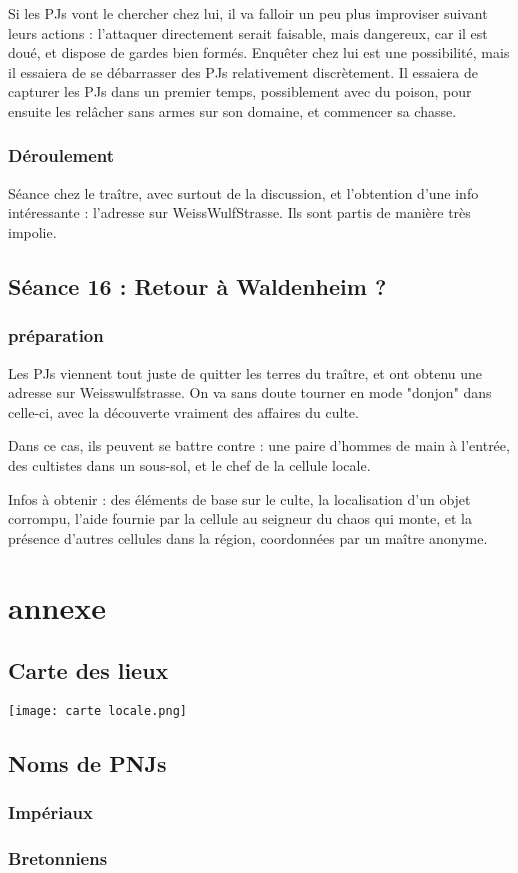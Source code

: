 \documentclass[10pt,a4paper]{book}
\begin{document}
Si les PJs vont le chercher chez lui, il va falloir un peu plus improviser suivant leurs actions : l'attaquer directement serait faisable, mais dangereux, car il est doué, et dispose de gardes bien formés. Enquêter chez lui est une possibilité, mais il essaiera de se débarrasser des PJs relativement discrètement. Il essaiera de capturer les PJs dans un premier temps, possiblement avec du poison, pour ensuite les relâcher sans armes sur son domaine, et commencer sa chasse.
\subsection{Déroulement}
Séance chez le traître, avec surtout de la discussion, et l'obtention d'une info intéressante : l'adresse sur WeissWulfStrasse. Ils sont partis de manière très impolie.
\section{Séance 16 : Retour à Waldenheim ?}
\subsection{préparation}
Les PJs viennent tout juste de quitter les terres du traître, et ont obtenu une adresse sur Weisswulfstrasse. On va sans doute tourner en mode "donjon" dans celle-ci, avec la découverte vraiment des affaires du culte.

Dans ce cas, ils peuvent se battre contre : une paire d'hommes de main à l'entrée, des cultistes dans un sous-sol, et le chef de la cellule locale.

Infos à obtenir : des éléments de base sur le culte, la localisation d'un objet corrompu, l'aide fournie par la cellule au seigneur du chaos qui monte, et la présence d'autres cellules dans la région, coordonnées par un maître anonyme.
\chapter*{annexe}
\section{Carte des lieux}
\texttt{[image: carte locale.png]}
\section*{Noms de PNJs}
\subsection*{Impériaux}
\subsection*{Bretonniens}
\end{document}
